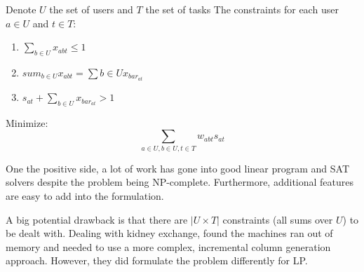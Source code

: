 \documentclass[main.tex]{subfiles}
\begin{document}
Denote $U$ the set of users and $T$ the set of tasks
The constraints for each user $a \in U$ and $t \in T$:
\begin{enumerate}
  \item $\sum_{b \in U} x_{abt} \leq 1$
  \item $sum_{b \in U} x_{abt} = \sum{b \in U} x_{bar_{at}}$
  \item $s_{at} + \sum_{b \in U} x_{bar_{at}} > 1$
\end{enumerate}

Minimize:
  $$\sum_{a \in U, b \in U, t \in T} w_{abt} s_{at}$$

One the positive side, a lot of work has gone into good linear program and SAT solvers despite the problem being NP-complete. Furthermore, additional features are easy to add into the formulation.

A big potential drawback is that there are $|U \times T|$ constraints (all sums over $U$) to be dealt with. Dealing with kidney exchange, \cite{Abr1} found the machines ran out of memory and needed to use a more complex, incremental column generation approach. However, they did formulate the problem differently for LP.
\end{document}
